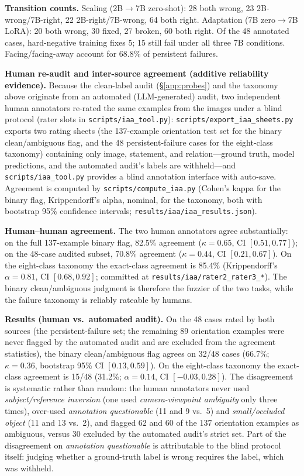 \textbf{Transition counts.} Scaling (2B$\rightarrow$7B zero-shot): 28 both
wrong, 23 2B-wrong/7B-right, 22 2B-right/7B-wrong, 64 both right. Adaptation
(7B zero$\rightarrow$7B LoRA): 20 both wrong, 30 fixed, 27 broken, 60 both
right. Of the 48 annotated cases, hard-negative training fixes 5; 15 still
fail under all three 7B conditions. Facing/facing-away account for 68.8\% of
persistent failures.

\textbf{Human re-audit and inter-source agreement (additive reliability evidence).}
Because the clean-label audit (\S\ref{app:probes}) and the taxonomy above
originate from an automated (LLM-generated) audit, two independent human
annotators re-rated the same examples from the images under a blind protocol
(rater slots in \texttt{scripts/iaa\_tool.py}):
\texttt{scripts/export\_iaa\_sheets.py} exports two rating sheets (the
137-example orientation test set for the binary clean/ambiguous flag, and
the 48 persistent-failure cases for the eight-class taxonomy) containing
only image, statement, and relation---ground truth, model predictions, and
the automated audit's labels are withheld---and \texttt{scripts/iaa\_tool.py}
provides a blind annotation interface with auto-save. Agreement is computed
by \texttt{scripts/compute\_iaa.py} (Cohen's kappa for the binary flag,
Krippendorff's alpha, nominal, for the taxonomy, both with bootstrap 95\%
confidence intervals; \texttt{results/iaa/iaa\_results.json}).

\textbf{Human--human agreement.} The two human annotators agree
substantially: on the full 137-example binary flag, 82.5\% agreement
($\kappa{=}0.65$, CI $[0.51, 0.77]$); on the 48-case audited subset,
70.8\% agreement ($\kappa{=}0.44$, CI $[0.21, 0.67]$). On the eight-class
taxonomy the exact-class agreement is 85.4\% (Krippendorff's
$\alpha{=}0.81$, CI $[0.68, 0.92]$; committed at
\texttt{results/iaa/rater2\_rater3\_*}). The binary clean/ambiguous judgment
is therefore the fuzzier of the two tasks, while the failure taxonomy is
reliably rateable by humans.

\textbf{Results (human vs.\ automated audit).} On the 48 cases rated by both
sources (the persistent-failure set; the remaining 89 orientation examples
were never flagged by the automated audit and are excluded from the
agreement statistics), the binary clean/ambiguous flag agrees on 32/48 cases
(66.7\%; $\kappa{=}0.36$, bootstrap 95\% CI $[0.13, 0.59]$). On the
eight-class taxonomy the exact-class agreement is 15/48 (31.2\%;
$\alpha{=}0.14$, CI $[-0.03, 0.28]$). The disagreement is systematic rather
than random: the human annotators never used \emph{subject/reference
inversion} (one used \emph{camera-viewpoint ambiguity} only three times),
over-used \emph{annotation questionable} (11 and 9 vs.\ 5) and
\emph{small/occluded object} (11 and 13 vs.\ 2), and flagged 62 and 60 of the
137 orientation examples as ambiguous, versus 30 excluded by the automated
audit's strict set. Part of the disagreement on \emph{annotation
questionable} is attributable to the blind protocol itself: judging whether a
ground-truth label is wrong requires the label, which was withheld.

